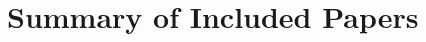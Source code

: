 
\chapter{Summary of Included Papers}
\label{chap:summary_of_included_papers}

\noindent 


\begingroup
\renewcommand\thesection{\Alph{section}} %




\endgroup
